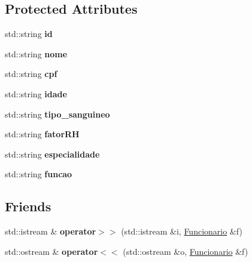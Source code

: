 \subsection*{Protected Attributes}
\begin{DoxyCompactItemize}
\item 
\mbox{\label{classFuncionario_a7c1e6557ef9b30185a2241a653a3da3e}} 
std\+::string {\bfseries id}
\item 
\mbox{\label{classFuncionario_ac9e214af6fa91e21aa376a81e28f17ae}} 
std\+::string {\bfseries nome}
\item 
\mbox{\label{classFuncionario_ab015f6593b7b62e7a9c2440dd334f97b}} 
std\+::string {\bfseries cpf}
\item 
\mbox{\label{classFuncionario_abf6781eb509eb242b5067d6526ef9a01}} 
std\+::string {\bfseries idade}
\item 
\mbox{\label{classFuncionario_a71fd2bf70bff1ed765bf7721ff22313e}} 
std\+::string {\bfseries tipo\+\_\+sanguineo}
\item 
\mbox{\label{classFuncionario_a74e88a04cc9f8bcd1d88ebb1acc7f6f0}} 
std\+::string {\bfseries fator\+RH}
\item 
\mbox{\label{classFuncionario_a3cf1d47d414662e9ced6b0b4829d0316}} 
std\+::string {\bfseries especialidade}
\item 
\mbox{\label{classFuncionario_ac82736fa17848d7f132e393a84a4c0c9}} 
std\+::string {\bfseries funcao}
\end{DoxyCompactItemize}
\subsection*{Friends}
\begin{DoxyCompactItemize}
\item 
\mbox{\label{classFuncionario_a2bb1f75049d15717556f551e25057e93}} 
std\+::istream \& {\bfseries operator$>$$>$} (std\+::istream \&i, \hyperlink{classFuncionario}{Funcionario} \&f)
\item 
\mbox{\label{classFuncionario_abdee4494d45e2c0bb334c7ad2a9411c9}} 
std\+::ostream \& {\bfseries operator$<$$<$} (std\+::ostream \&o, \hyperlink{classFuncionario}{Funcionario} \&f)
\end{DoxyCompactItemize}


